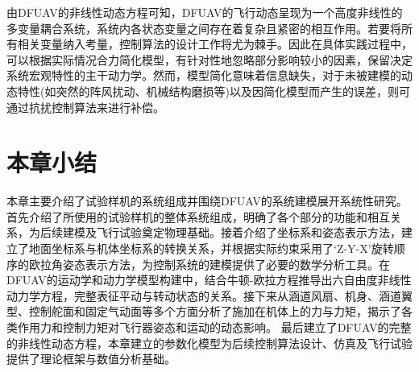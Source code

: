 由DFUAV的非线性动态方程可知，DFUAV的飞行动态呈现为一个高度非线性的多变量耦合系统，系统内各状态变量之间存在着复杂且紧密的相互作用。若要将所有相关变量纳入考量，控制算法的设计工作将尤为棘手。因此在具体实践过程中，可以根据实际情况合力简化模型，有针对性地忽略部分影响较小的因素，保留决定系统宏观特性的主干动力学。然而，模型简化意味着信息缺失，对于未被建模的动态特性(如突然的阵风扰动、机械结构磨损等)以及因简化模型而产生的误差，则可通过抗扰控制算法来进行补偿。

\section{本章小结}

本章主要介绍了试验样机的系统组成并围绕DFUAV的系统建模展开系统性研究。
首先介绍了所使用的试验样机的整体系统组成，明确了各个部分的功能和相互关系，为后续建模及飞行试验奠定物理基础。接着介绍了坐标系和姿态表示方法，建立了地面坐标系与机体坐标系的转换关系，并根据实际约束采用了‘Z-Y-X’旋转顺序的欧拉角姿态表示方法，为控制系统的建模提供了必要的数学分析工具。在DFUAV的运动学和动力学模型构建中，结合牛顿-欧拉方程推导出六自由度非线性动力学方程，完整表征平动与转动状态的关系。接下来从涵道风扇、机身、涵道翼型、控制舵面和固定气动面等多个方面分析了施加在机体上的力与力矩，揭示了各类作用力和控制力矩对飞行器姿态和运动的动态影响。
最后建立了DFUAV的完整的非线性动态方程，本章建立的参数化模型为后续控制算法设计、仿真及飞行试验提供了理论框架与数值分析基础。
